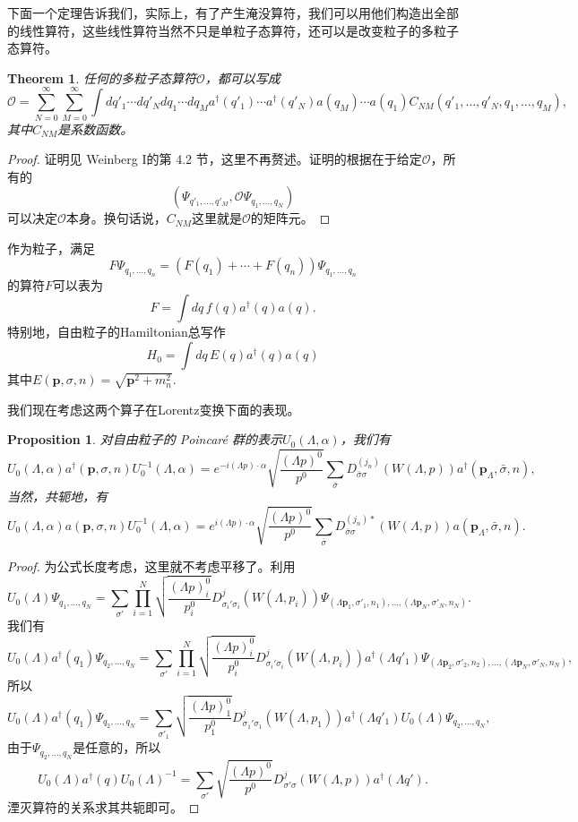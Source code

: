 \documentclass[11pt]{article}
\theoremstyle{definition}
\theoremstyle{plain}
\newtheorem{thm}[para]{Theorem}
\newtheorem{pro}[para]{Proposition}
\begin{document}
下面一个定理告诉我们，实际上，有了产生淹没算符，我们可以用他们构造出全部的线性算符，这些线性算符当然不只是单粒子态算符，还可以是改变粒子的多粒子态算符。

\begin{thm}
任何的多粒子态算符$\mathcal{O}$，都可以写成
\[
	\mathcal{O}=\sum_{N=0}^\infty \sum_{M=0}^\infty \int d q'_1\cdots d q'_N d q_1\cdots d q_M a^\dag (q'_1)\cdots a^\dag (q'_N) a(q_M)\cdots a(q_1)C_{NM}(q'_1,\dots,q'_N,q_1,\dots,q_M),
\]
其中$C_{NM}$是系数函数。
\end{thm}

\begin{proof}
证明见 Weinberg I的第 4.2 节，这里不再赘述。证明的根据在于给定$\mathcal O$，所有的
\[
	(\Psi_{q'_1,\dots,q'_M},\mathcal O \Psi_{q_1,\dots,q_N})
\]
可以决定$\mathcal O$本身。换句话说，$C_{NM}$这里就是$\mathcal O$的矩阵元。
\end{proof}

作为粒子，满足
\[
	F\Psi_{q_1,\dots,q_n}=(F(q_1)+\cdots+F(q_n))\Psi_{q_1,\dots,q_n}
\]
的算符$F$可以表为
\[
	F=\int dq \,f(q)a^\dag(q)a(q).
\]
特别地，自由粒子的Hamiltonian总写作
\[
	H_0=\int dq \,E(q)a^\dag(q)a(q)
\]
其中$E(\bm{p},\sigma,n)=\sqrt{\bm{p}^2+m_n^2}$.

我们现在考虑这两个算子在Lorentz变换下面的表现。
\begin{pro}
对自由粒子的 Poincar\'{e} 群的表示$U_0(\Lambda,\alpha)$，我们有
\[
	U_0(\Lambda,\alpha)a^\dag(\bm{p},\sigma,n)U_0^{-1}(\Lambda,\alpha)=e^{-i(\Lambda p)\cdot \alpha}\sqrt{\frac{(\Lambda p)^0}{p^0}}\sum_{\bar{\sigma}} D^{(j_n)}_{\bar{\sigma}\sigma}\left(W(\Lambda,p)\right)a^\dag(\bm{p}_\Lambda,\bar{\sigma},n),
\]
当然，共轭地，有
\[
	U_0(\Lambda,\alpha)a(\bm{p},\sigma,n)U_0^{-1}(\Lambda,\alpha)=e^{i(\Lambda p)\cdot \alpha}\sqrt{\frac{(\Lambda p)^0}{p^0}}\sum_{\bar{\sigma}} D^{(j_n)*}_{\bar{\sigma}\sigma}\left(W(\Lambda,p)\right)a(\bm{p}_\Lambda,\bar{\sigma},n).
\]
\end{pro}

\begin{proof}
为公式长度考虑，这里就不考虑平移了。利用
\[
	U_0(\Lambda)\Psi_{q_1,\dots,q_N}=\sum_{\sigma'}\prod_{i=1}^N \sqrt{\frac{(\Lambda p)^0_i}{p^0_i}}D^{j}_{\sigma_i'\sigma_i}(W(\Lambda,p_i))\Psi_{(\Lambda \bm{p}_1,\sigma'_1,n_1),\dots,(\Lambda \bm{p}_N,\sigma'_N,n_N)}.
\]
我们有
\[
	U_0(\Lambda)a^\dag(q_1)\Psi_{q_2,\dots,q_N}=\sum_{\sigma'}\prod_{i=1}^N \sqrt{\frac{(\Lambda p)^0_i}{p^0_i}}D^{j}_{\sigma_i'\sigma_i}(W(\Lambda,p_i))a^\dag(\Lambda q'_1)\Psi_{(\Lambda \bm{p}_2,\sigma'_2,n_2),\dots,(\Lambda \bm{p}_N,\sigma'_N,n_N)},
\]
所以
\[
	U_0(\Lambda)a^\dag(q_1)\Psi_{q_2,\dots,q_N}=\sum_{\sigma'_1}\sqrt{\frac{(\Lambda p)^0_1}{p^0_1}}D^{j}_{\sigma_1'\sigma_1}(W(\Lambda,p_1))a^\dag(\Lambda q'_1)U_0(\Lambda)\Psi_{q_2,\dots,q_N},
\]
由于$\Psi_{q_2,\dots,q_N}$是任意的，所以
\[
	U_0(\Lambda)a^\dag(q)U_0(\Lambda)^{-1}=\sum_{\sigma'}\sqrt{\frac{(\Lambda p)^0}{p^0}}D^{j}_{\sigma'\sigma}(W(\Lambda,p))a^\dag(\Lambda q').
\]
湮灭算符的关系求其共轭即可。
\end{proof}
\end{document}
